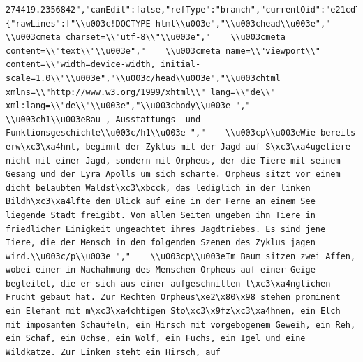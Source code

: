 \documentclass[
  letterpaper,
]{book}
\begin{document}
\begin{verbatim}
274419.2356842","canEdit":false,"refType":"branch","currentOid":"e21cd78de5eaeb22b84cdcdee94f9dff6bef0924"},"path":"text/orpheus.html","currentUser":null,"blob":{"rawLines":["\\u003c!DOCTYPE html\\u003e","\\u003chead\\u003e","    \\u003cmeta charset=\\"utf-8\\"\\u003e","    \\u003cmeta content=\\"text\\"\\u003e","    \\u003cmeta name=\\"viewport\\" content=\\"width=device-width, initial-scale=1.0\\"\\u003e","\\u003c/head\\u003e","\\u003chtml xmlns=\\"http://www.w3.org/1999/xhtml\\" lang=\\"de\\" xml:lang=\\"de\\"\\u003e","\\u003cbody\\u003e ","    \\u003ch1\\u003eBau-, Ausstattungs- und Funktionsgeschichte\\u003c/h1\\u003e ","    \\u003cp\\u003eWie bereits erw\xc3\xa4hnt, beginnt der Zyklus mit der Jagd auf S\xc3\xa4ugetiere nicht mit einer Jagd, sondern mit Orpheus, der die Tiere mit seinem Gesang und der Lyra Apolls um sich scharte. Orpheus sitzt vor einem dicht belaubten Waldst\xc3\xbcck, das lediglich in der linken Bildh\xc3\xa4lfte den Blick auf eine in der Ferne an einem See liegende Stadt freigibt. Von allen Seiten umgeben ihn Tiere in friedlicher Einigkeit ungeachtet ihres Jagdtriebes. Es sind jene Tiere, die der Mensch in den folgenden Szenen des Zyklus jagen wird.\\u003c/p\\u003e ","    \\u003cp\\u003eIm Baum sitzen zwei Affen, wobei einer in Nachahmung des Menschen Orpheus auf einer Geige begleitet, die er sich aus einer aufgeschnitten l\xc3\xa4nglichen Frucht gebaut hat. Zur Rechten Orpheus\xe2\x80\x98 stehen prominent ein Elefant mit m\xc3\xa4chtigen Sto\xc3\x9fz\xc3\xa4hnen, ein Elch mit imposanten Schaufeln, ein Hirsch mit vorgebogenem Geweih, ein Reh, ein Schaf, ein Ochse, ein Wolf, ein Fuchs, ein Igel und eine Wildkatze. Zur Linken steht ein Hirsch, auf 
\end{verbatim}
\end{document}

